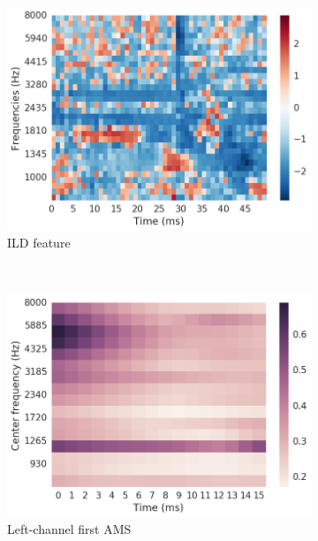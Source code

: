 \begin{figure}[htb]
\begin{subfigure}[t]{0.3\textwidth}
	\hspace*{-2cm}
	\centering
	\includegraphics[scale=0.3,valign=t]{images-data/ild}
	\caption{ILD feature}
	\label{fig:methods:ild}
\end{subfigure}~
\begin{subfigure}[t]{0.3\textwidth}
	\hspace*{-0.5cm}
	\centering
	\includegraphics[scale=0.3,valign=t]{images-data/ams}
	\caption{Left-channel first AMS}
	\label{fig:methods:ams}
\end{subfigure}~
\begin{subfigure}[t]{0.3\textwidth}
	\centering

\end{subfigure}
\end{figure}
